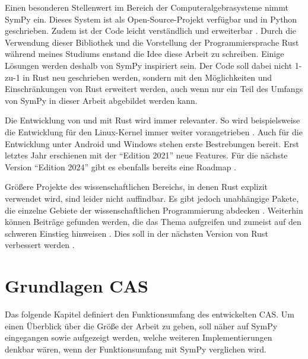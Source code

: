 \documentclass[11pt,a4paper, ngerman]{article}
\begin{document}
Einen besonderen Stellenwert im Bereich der Computeralgebrasysteme nimmt SymPy ein. Dieses System ist als Open-Source-Projekt verfügbar und in Python geschrieben. Zudem ist der Code leicht verständlich und erweiterbar \cite[S. 1]{SympyPeerJ}. Durch die Verwendung dieser Bibliothek und die Vorstellung der Programmiersprache Rust während meines Studiums enstand die Idee diese Arbeit zu schreiben. Einige Lösungen werden deshalb von SymPy inspiriert sein. Der Code soll dabei nicht 1-zu-1 in Rust neu geschrieben werden, sondern mit den Möglichkeiten und Einschränkungen von Rust erweitert werden, auch wenn nur ein Teil des Umfangs von SymPy in dieser Arbeit abgebildet werden kann.

Die Entwicklung von und mit Rust wird immer relevanter. So wird beispielsweise die Entwicklung für den Linux-Kernel immer weiter vorangetrieben \cite{RustLinux}. Auch für die Entwicklung unter Android \cite{GoogleExample} und Windows \cite{WindowsRust} stehen erste Bestrebungen bereit. Erst letztes Jahr erschienen mit der ``Edition 2021'' \cite{RustEditon2021} neue Features. Für die nächste Version ``Edition 2024'' gibt es ebenfalls bereits eine Roadmap \cite{RustEditon2024}.

Größere Projekte des wissenschaftlichen Bereichs, in denen Rust explizit verwendet wird, sind leider nicht auffindbar. Es gibt jedoch unabhängige Pakete, die einzelne Gebiete der wissenschaftlichen Programmierung abdecken \cite{RustEx1} \cite{RustEx2} \cite{RustEx3}. Weiterhin können Beiträge gefunden werden, die das Thema aufgreifen und zumeist auf den schweren Einstieg hinweisen \cite{RustUse1} \cite{RustUse2} \cite{RustUse3}. Dies soll in der nächsten Version von Rust verbessert werden \cite{RustEditon2024Specific}.

\newpage

\section{Grundlagen CAS}
Das folgende Kapitel definiert den Funktionsumfang des entwickelten CAS. Um einen Überblick über die Größe der Arbeit zu geben, soll näher auf SymPy eingegangen sowie aufgezeigt werden, welche weiteren Implementierungen denkbar wären, wenn der Funktionsumfang mit SymPy verglichen wird.
\end{document}
